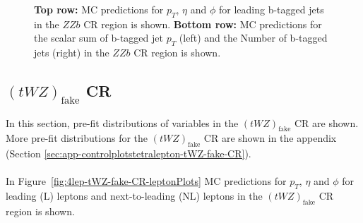 \begin{figure}[htbp]
    \caption{\textbf{Top row:} MC predictions for $p_{T}$, $\eta$ and $\phi$ for leading b-tagged jets in the $ZZb$ CR region  is shown. \textbf{Bottom row:} MC predictions for the scalar sum of b-tagged jet $p_{T}$ (left) and the Number of b-tagged jets (right) in the $ZZb$ CR region  is shown.}
  \label{fig:4lep-ZZb-CR-bjetPlots}
\end{figure}



\subsection{$(tWZ)_{\text{fake}}$ CR}
\label{sec:controlplotstetralepton-tWZ-fake-CR}


In this section, pre-fit distributions of variables in the $(tWZ)_{\text{fake}}$ CR are shown. More pre-fit distributions for the $(tWZ)_{\text{fake}}$ CR are shown in the appendix (Section \ref{sec:app-controlplotstetralepton-tWZ-fake-CR}).\\\\

In Figure~\ref{fig:4lep-tWZ-fake-CR-leptonPlots} MC predictions for $p_{T}$, $\eta$ and $\phi$ for leading (L) leptons and next-to-leading (NL) leptons in the $(tWZ)_{\text{fake}}$ CR region is shown.

